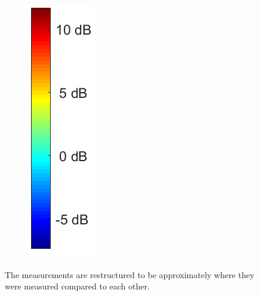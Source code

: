 \begin{figure}[H]
\begin{subfigure}[b]{0.1\textwidth}
\includegraphics[width=\textwidth]{figures/Not_Norm_space_colorbar.png}
\end{subfigure}
\captionsetup{belowskip=-1.5em}
\caption{The measurements are restructured to be approximately where they were measured compared to each other.}
\label{fig:Not_norm_space}
\end{figure}

